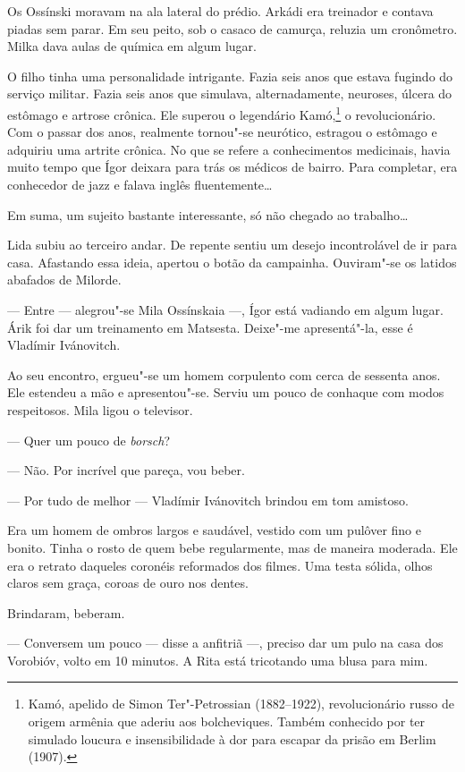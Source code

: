 Os Ossínski moravam na ala lateral do prédio. Arkádi era treinador e
contava piadas sem parar. Em seu peito, sob o casaco de camurça, reluzia
um cronômetro. Milka dava aulas de química em algum lugar.

O filho tinha uma personalidade intrigante. Fazia seis anos que estava
fugindo do serviço militar. Fazia seis anos que simulava,
alternadamente, neuroses, úlcera do estômago e artrose crônica. Ele
superou o legendário Kamó,\footnote{Kamó, apelido de Simon
  Ter"-Petrossian (1882--1922), revolucionário russo de origem armênia
  que aderiu aos bolcheviques. Também conhecido por ter simulado loucura
  e insensibilidade à dor para escapar da prisão em Berlim (1907).} o
revolucionário. Com o passar dos anos, realmente tornou"-se neurótico,
estragou o estômago e adquiriu uma artrite crônica. No que se refere a
conhecimentos medicinais, havia muito tempo que Ígor deixara para trás
os médicos de bairro. Para completar, era conhecedor de jazz e falava
inglês fluentemente\ldots{}

Em suma, um sujeito bastante interessante, só não chegado ao trabalho\ldots{}

Lida subiu ao terceiro andar. De repente sentiu um desejo incontrolável
de ir para casa. Afastando essa ideia, apertou o botão da campainha.
Ouviram"-se os latidos abafados de Milorde.

--- Entre --- alegrou"-se Mila Ossínskaia ---, Ígor está vadiando em
algum lugar. Árik foi dar um treinamento em Matsesta. Deixe"-me
apresentá"-la, esse é Vladímir Ivánovitch.

Ao seu encontro, ergueu"-se um homem corpulento com cerca de sessenta
anos. Ele estendeu a mão e apresentou"-se. Serviu um pouco de conhaque
com modos respeitosos. Mila ligou o televisor.

--- Quer um pouco de \emph{borsch}?

--- Não. Por incrível que pareça, vou beber.

--- Por tudo de melhor --- Vladímir Ivánovitch brindou em tom amistoso.

Era um homem de ombros largos e saudável, vestido com um pulôver fino e
bonito. Tinha o rosto de quem bebe regularmente, mas de maneira
moderada. Ele era o retrato daqueles coronéis reformados dos filmes. Uma
testa sólida, olhos claros sem graça, coroas de ouro nos dentes.

Brindaram, beberam.

--- Conversem um pouco --- disse a anfitriã ---, preciso dar um pulo na
casa dos Vorobióv, volto em 10 minutos. A Rita está tricotando uma blusa
para mim.

